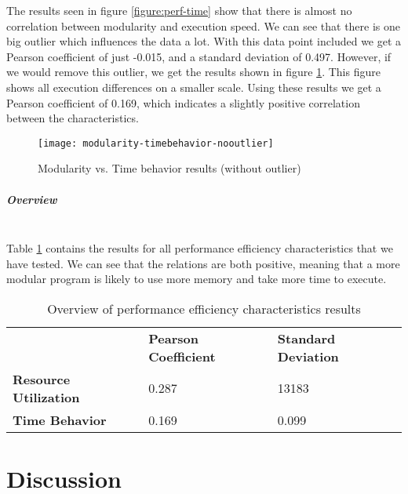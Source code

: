 \documentclass[twoside]{uva-inf-bachelor-thesis}
\newcommand{\myparagraph}[1]{\paragraph{#1}\mbox{}\\}
\begin{document}
The results seen in figure \ref{figure:perf-time} show that there is almost no correlation between modularity and execution speed. We can see that there is one big outlier which influences the data a lot. With this data point included we get a Pearson coefficient of just -0.015, and a standard deviation of 0.497. However, if we would remove this outlier, we get the results shown in figure \ref{figure:perf-time-no}. This figure shows all execution differences on a smaller scale. Using these results we get a Pearson coefficient of 0.169, which indicates a slightly positive correlation between the characteristics.

\begin{figure}[H]
    \label{figure:perf-time-no}
    \caption{Modularity vs. Time behavior results (without outlier)}
    \centering
        \texttt{[image: modularity-timebehavior-nooutlier]}
\end{figure}

\myparagraph{Overview}
Table \ref{table:perf-overview} contains the results for all performance efficiency characteristics that we have tested. We can see that the relations are both positive, meaning that a more modular program is likely to use more memory and take more time to execute.

\begin{table}[H]
\centering
\caption{Overview of performance efficiency characteristics results}
\label{table:perf-overview}
\begin{tabular}{lll}
                              & \textbf{Pearson Coefficient} & \textbf{Standard Deviation} \\
\textbf{Resource Utilization} & 0.287                        & 13183                       \\
\textbf{Time Behavior}        & 0.169                        & 0.099                      
\end{tabular}
\end{table}

\chapter{Discussion}
\end{document}
